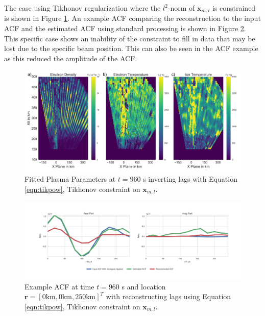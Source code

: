 The case using Tikhonov regularization where the $l^2$-norm of $\mathbf{x}_{m,l}$ is constrained is shown in Figure \ref{fig:tikpow}. An example ACF comparing the reconstruction to the input ACF and the estimated ACF using standard processing is shown in Figure \ref{fig:tikpowacf}. This specific case shows an inability of the constraint to fill in data that may be lost due to the specific beam position. This can also be seen in the ACF example as this reduced the amplitude of the ACF.

\begin{figure}[!ht]
\centering
\includegraphics[width=6in]{tikfitted}
\caption{Fitted Plasma Parameters at $t=960$ s inverting lags with Equation \ref{eqn:tikpow}, Tikhonov constraint on $\mathbf{x}_{m,l}$. }
\label{fig:tikpow}
\end{figure}

\begin{figure}[!ht]
\centering
\includegraphics[width=6in]{acftik}
\caption{Example ACF at time $t=960$ s and location $\mathbf{r}=[0  \text{km},0  \text{km},250 \text{km}]^T$ with reconstructing lags using Equation \ref{eqn:tikpow}, Tikhonov constraint on $\mathbf{x}_{m,l}$. }
\label{fig:tikpowacf}
\end{figure}

